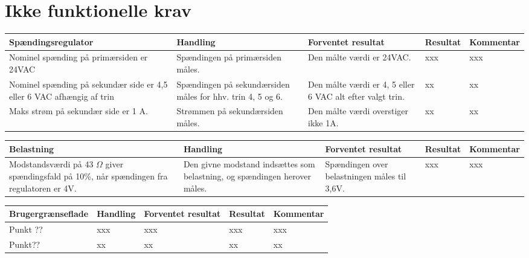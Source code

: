 \section{Ikke funktionelle krav}
\begin{table}[htbp]
	\centering
	\begin{tabular}{|p{4cm}|p{3cm}|p{4cm}|p{2cm}|p{2.5cm}|}
		\hline
		\textbf{Spændingsregulator} & \textbf{Handling} & \textbf{Forventet resultat} & \textbf{Resultat} &\textbf{Kommentar} \\\hline
		Nominel spænding på primærsiden er 24VAC & Spændingen på primærsiden måles. & Den målte værdi er 24VAC. & xxx & xxx \\\hline
		Nominel spænding på sekundær side er 4,5 eller 6 VAC afhængig af trin & Spændingen på sekundærsiden måles for hhv. trin 4, 5 og 6. & Den målte værdi er 4, 5 eller 6 VAC alt efter valgt trin. & xx & xx \\\hline
		Maks strøm på sekundær side er 1 A. & Strømmen på sekundærsiden måles. & Den målte værdi overstiger ikke 1A. & xx & xx \\\hline
	\end{tabular}
	
\end{table}

\begin{table}[htbp]
	\centering
	\begin{tabular}{|p{4cm}|p{3cm}|p{4cm}|p{2cm}|p{2.5cm}|}
		\hline
		\textbf{Belastning} & \textbf{Handling} & \textbf{Forventet resultat} & \textbf{Resultat} &\textbf{Kommentar} \\\hline
		Modstandsværdi på 43 $\Omega$ giver spændingsfald på 10\%, når spændingen fra regulatoren er 4V. & Den givne modstand indsættes som belastning, og spændingen herover måles. & Spændingen over belastningen måles til 3,6V. & xxx & xxx \\\hline	
	\end{tabular}

	
\end{table}
\begin{table}[htbp]
	\centering
	\begin{tabular}{|p{4cm}|p{3cm}|p{4cm}|p{2cm}|p{2.5cm}|}
		\hline
		\textbf{Brugergrænseflade} & \textbf{Handling} & \textbf{Forventet resultat} & \textbf{Resultat} &\textbf{Kommentar} \\\hline
		Punkt ?? & xxx & xxx & xxx & xxx \\\hline
		Punkt?? & xx & xx & xx & xx \\\hline
		
		
	\end{tabular}

	
\end{table}